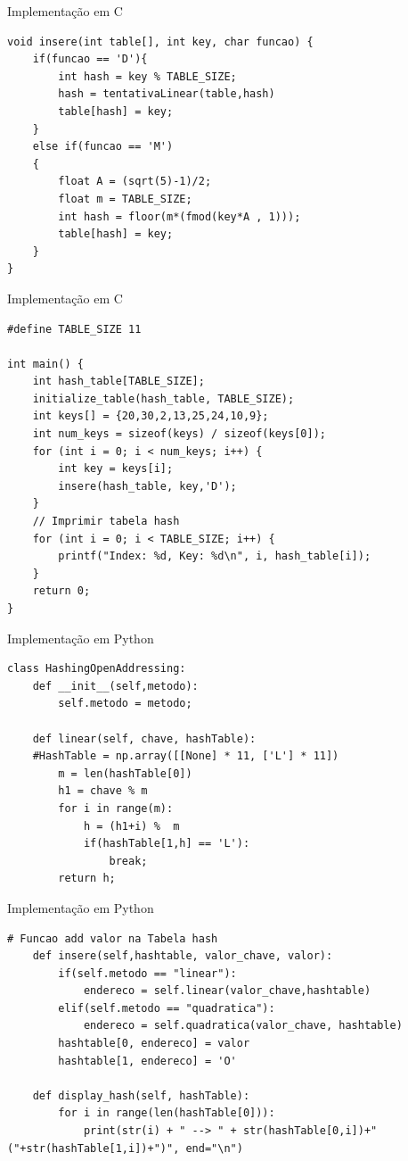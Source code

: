 \documentclass{beamer}
\begin{document}
\begin{frame}[fragile]{Implementação em C}
\footnotesize
\begin{lstlisting}[style=CStyle]
void insere(int table[], int key, char funcao) {
    if(funcao == 'D'){
        int hash = key % TABLE_SIZE;
        hash = tentativaLinear(table,hash)
        table[hash] = key;
    }
    else if(funcao == 'M')
    {
        float A = (sqrt(5)-1)/2;
        float m = TABLE_SIZE;
        int hash = floor(m*(fmod(key*A , 1)));
        table[hash] = key;
    }
}
\end{lstlisting}
\end{frame}


\begin{frame}[fragile]{Implementação em C}
\footnotesize
\begin{lstlisting}[style=CStyle]
#define TABLE_SIZE 11

int main() {
    int hash_table[TABLE_SIZE];
    initialize_table(hash_table, TABLE_SIZE);
    int keys[] = {20,30,2,13,25,24,10,9};
    int num_keys = sizeof(keys) / sizeof(keys[0]);
    for (int i = 0; i < num_keys; i++) {
        int key = keys[i];
        insere(hash_table, key,'D');
    }
    // Imprimir tabela hash
    for (int i = 0; i < TABLE_SIZE; i++) {
        printf("Index: %d, Key: %d\n", i, hash_table[i]);
    }
    return 0;
}
\end{lstlisting}
\end{frame}

\begin{frame}[fragile]{Implementação em Python} 
\centering\footnotesize
\begin{lstlisting}[style=PythonStyle]
  class HashingOpenAddressing:
    def __init__(self,metodo):
        self.metodo = metodo;

    def linear(self, chave, hashTable):
    #HashTable = np.array([[None] * 11, ['L'] * 11])
        m = len(hashTable[0])
        h1 = chave % m
        for i in range(m):
            h = (h1+i) %  m
            if(hashTable[1,h] == 'L'):
                break;
        return h;
\end{lstlisting}
\end{frame}

\begin{frame}[fragile]{Implementação em Python} 
\centering\footnotesize
\begin{lstlisting}[style=PythonStyle]
  # Funcao add valor na Tabela hash
    def insere(self,hashtable, valor_chave, valor):
        if(self.metodo == "linear"):
            endereco = self.linear(valor_chave,hashtable)
        elif(self.metodo == "quadratica"):
            endereco = self.quadratica(valor_chave, hashtable)
        hashtable[0, endereco] = valor
        hashtable[1, endereco] = 'O'
    
    def display_hash(self, hashTable):
        for i in range(len(hashTable[0])):
            print(str(i) + " --> " + str(hashTable[0,i])+" ("+str(hashTable[1,i])+")", end="\n")
\end{lstlisting}
\end{frame}
\end{document}
